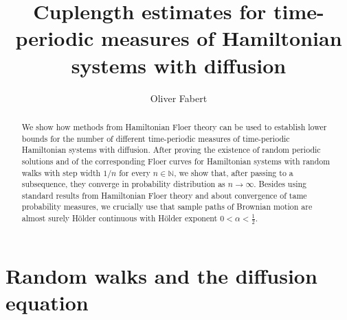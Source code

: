\documentclass[a4paper,11pt]{amsart}
\title{Cuplength estimates for time-periodic measures of Hamiltonian systems with diffusion}
\author{Oliver Fabert}
\newcommand{\NN}{\mathbb{N}}
\begin{document}
\maketitle

\begin{abstract} We show how methods from Hamiltonian Floer theory can be used to establish lower bounds for the number of different time-periodic measures of time-periodic Hamiltonian systems with diffusion. After proving the existence of random periodic solutions and of the corresponding Floer curves for Hamiltonian systems with random walks with step width $1/n$ for every $n\in\NN$, we show that, after passing to a subsequence, they converge in probability distribution as $n\to\infty$. Besides using standard results from Hamiltonian Floer theory and about convergence of tame probability measures, we crucially use that sample paths of Brownian motion are almost surely H\"older continuous with H\"older exponent $0<\alpha<\frac{1}{2}$. \end{abstract}

\tableofcontents
{} 

\section{Random walks and the diffusion equation}\label{section 1}
\end{document}
